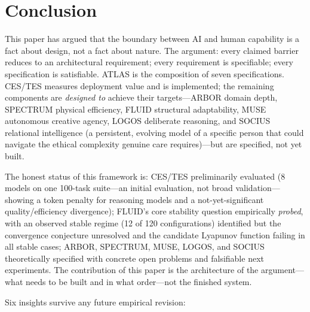 \documentclass[12pt]{article}
\begin{document}
\section{Conclusion}

This paper has argued that the boundary between AI and human capability is a fact about design, not a fact about nature. The argument: every claimed barrier reduces to an architectural requirement; every requirement is specifiable; every specification is satisfiable. ATLAS is the composition of seven specifications. CES/TES measures deployment value and is implemented; the remaining components are \emph{designed to} achieve their targets---ARBOR domain depth, SPECTRUM physical efficiency, FLUID structural adaptability, MUSE autonomous creative agency, LOGOS deliberate reasoning, and SOCIUS relational intelligence (a persistent, evolving model of a specific person that could navigate the ethical complexity genuine care requires)---but are specified, not yet built.

The honest status of this framework is: CES/TES preliminarily evaluated (8 models on one 100-task suite---an initial evaluation, not broad validation---showing a token penalty for reasoning models and a not-yet-significant quality/efficiency divergence); FLUID's core stability question empirically \emph{probed}, with an observed stable regime (12 of 120 configurations) identified but the convergence conjecture unresolved and the candidate Lyapunov function failing in all stable cases; ARBOR, SPECTRUM, MUSE, LOGOS, and SOCIUS theoretically specified with concrete open problems and falsifiable next experiments. The contribution of this paper is the architecture of the argument---what needs to be built and in what order---not the finished system.

Six insights survive any future empirical revision:
\end{document}
